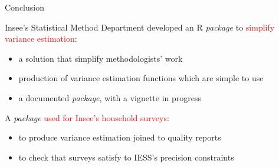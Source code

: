 \documentclass[xcolor=dvipsnames]{beamer}
\begin{document}
\begin{frame}{Conclusion}

Insee's Statistical Method Department developed an R \textit{package} to \textcolor{red}{simplify variance estimation}:
\vspace{0.1 cm}
\begin{itemize}
    \item a solution that simplify methodologists' work
    \vspace{0.1 cm}
    \item production of variance estimation functions which are simple to use
    \vspace{0.1 cm}
    \item a documented \textit{package}, with a vignette in progress
\end{itemize}

\vspace{0.5 cm}

A \textit{package} \textcolor{red}{used for Insee's household surveys}:
\begin{itemize}
    \vspace{0.1 cm}
    \item to produce variance estimation joined to quality reports
    \vspace{0.1 cm}
    \item to check that surveys satisfy to IESS's precision constraints
\end{itemize}

\end{frame}
\end{document}
